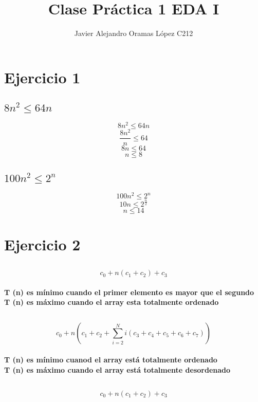 \documentclass[10pt,a4paper]{article}
\author{Javier Alejandro Oramas L\'opez C212}
\title{Clase Pr\'actica 1 EDA I}
\begin{document}
    \maketitle
    \section{Ejercicio 1}
        \subsection{ $ 8n^{2} \leq 64n $}
            \[ 8n^{2} \leq 64n \]
            \[ \frac{8n^{2}}{n} \leq 64 \]
            \[ 8n \leq 64\]
            \[ n \leq 8 \]        
         \subsection{$ 100n^2 \leq 2^n $}
            \[ 100n^2 \leq 2^n \]
            \[ 10n \leq 2^{\frac{n}{2}} \]
            \[ n \leq 14 \]            
    \section{Ejercicio 2}
        \subsection{}
            \[ c_{0} + n( c_{1} + c_{2}) +c_{3} \]
            \paragraph{
                T (n) es m\'inimo cuando el primer elemento es mayor que el segundo \\
                T (n) es m\'aximo cuando el array esta totalmente ordenado
                }
        \subsection{ }
            \[ c_{0} + n \left( c_{1} + c_{2} + \sum_{i=2}^{N} i \left(c_{3} +c_{4} + c_{5} +c_{6} +c_{7} \right)\right) \]
            \paragraph{
                T (n) es m\'inimo cuanod el array est\'a totalmente ordenado \\
                T (n) es m\'aximo cuando el array est\'a totalmente desordenado
                }
        \subsection{ }  
            \[ c_{0} + n(c_{1} + c_{2}) + c_{3} \]
\end{document}
